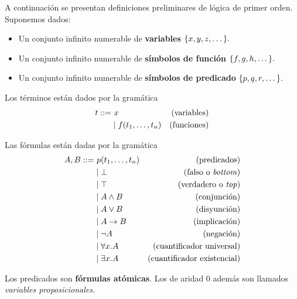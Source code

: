A continuación se presentan definiciones preliminares de lógica de primer orden. Suponemos dados:

\begin{itemize}
    \item Un conjunto infinito numerable de \textbf{variables}
    \(
        \{x, y, z, \dots\}.
    \)
    \item Un conjunto infinito numerable de \textbf{símbolos de función}
    \(
        \{f, g, h, \dots\}.
    \)
    \item Un conjunto infinito numerable de \textbf{símbolos de predicado}
    \(
        \{p, q, r, \dots\}.
    \)
\end{itemize}

\begin{definition}[Términos]
    \label{intro:def:term}
    Los términos están dados por la gramática
    \begin{align*}
        \term ::= &\ \var                               &\text{(variables)} \\
                  & \mid \fun(\term_1, \dots, \term_n) &\text{(funciones)}
    \end{align*}
\end{definition}

\begin{definition}[Fórmulas]
    Las fórmulas están dadas por la gramática
    \begin{align*}
        A, B ::=
         & \ p(t_1, \dots, t_n) & (\text{predicados})                \\
         & \mid \bot                     & \text{(falso o \textit{bottom})}         \\
         & \mid \top                      & \text{(verdadero o \textit{top})} \\
         & \mid A \wedge B        & \text{(conjunción)}                \\
         & \mid A \vee B         & \text{(disyunción)}                \\
         & \mid A \to B        & \text{(implicación)}               \\
         & \mid \neg A                 & \text{(negación)}                  \\
         & \mid \forall x . A        & \text{(cuantificador universal)}   \\
         & \mid \exists x . A        & \text{(cuantificador existencial)}
    \end{align*}

    Los predicados son \textbf{fórmulas atómicas}. Los de aridad 0 además son llamados \textit{variables proposicionales}.
\end{definition}

